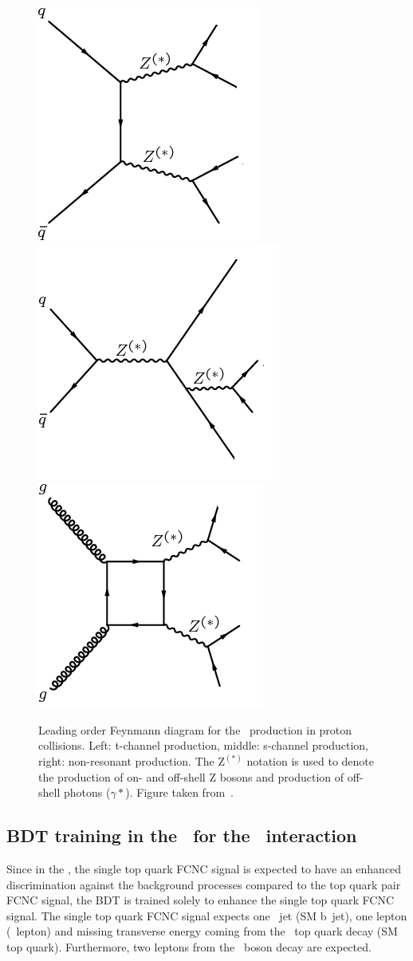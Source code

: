 \begin{figure}[htbp]
	\centering
	\includegraphics[width=0.3\linewidth]{6_Search/Figures/Feynman/ZZ}
	\includegraphics[width=0.3\linewidth]{6_Search/Figures/Feynman/ZZ2}
		\includegraphics[width=0.3\linewidth]{6_Search/Figures/Feynman/ZZ3}
	\caption{Leading order Feynmann diagram for the \ZZ\ production in proton collisions. Left: t-channel production, middle: s-channel production, right: non-resonant production. The Z$^{(*)}$ notation is used to denote the production of on- and off-shell Z bosons and production of off-shell photons ($\gamma*$). Figure taken from~\cite{Aad:2055247}.}
	\label{fig:ZZ}
\end{figure}
\newpage
\subsection{BDT training in the \STSR\ for the \Zut\ interaction}
\label{sec:BDTSTSRZUT}
Since in the \STSR, the single top quark FCNC signal is expected to have an enhanced discrimination against the background processes compared to the top quark pair FCNC signal,  the BDT is trained solely to enhance the single top quark FCNC signal. The single top quark FCNC signal expects one \Pbottom\ jet (SM b~jet), one lepton (\PW\ lepton) and missing transverse energy coming from the \SM\ top quark decay (SM top quark). Furthermore, two leptons from the \PZ\ boson decay are expected. 

